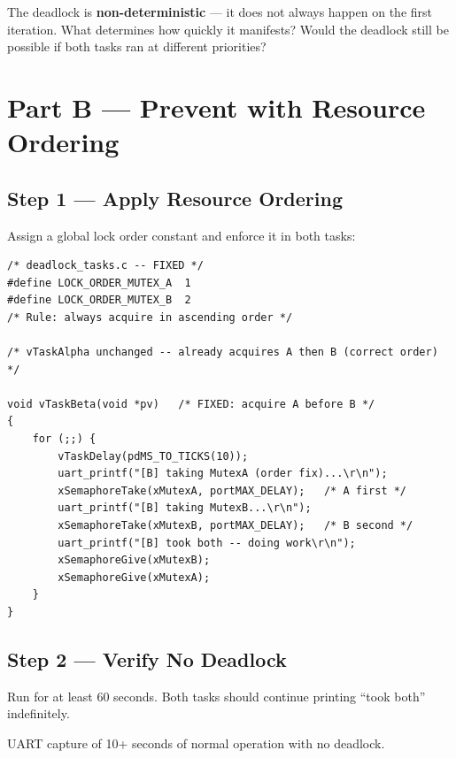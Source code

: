 \documentclass[11pt, a4paper]{article}
\begin{document}
\begin{questionbox}[~A2]
  The deadlock is \textbf{non-deterministic} --- it does not always happen on the first
  iteration. What determines how quickly it manifests? Would the deadlock still be
  possible if both tasks ran at different priorities?
\end{questionbox}

\section{Part B --- Prevent with Resource Ordering}

\subsection{Step 1 --- Apply Resource Ordering}

Assign a global lock order constant and enforce it in both tasks:

\begin{lstlisting}[style=cstyle]
/* deadlock_tasks.c -- FIXED */
#define LOCK_ORDER_MUTEX_A  1
#define LOCK_ORDER_MUTEX_B  2
/* Rule: always acquire in ascending order */

/* vTaskAlpha unchanged -- already acquires A then B (correct order) */

void vTaskBeta(void *pv)   /* FIXED: acquire A before B */
{
    for (;;) {
        vTaskDelay(pdMS_TO_TICKS(10));
        uart_printf("[B] taking MutexA (order fix)...\r\n");
        xSemaphoreTake(xMutexA, portMAX_DELAY);   /* A first */
        uart_printf("[B] taking MutexB...\r\n");
        xSemaphoreTake(xMutexB, portMAX_DELAY);   /* B second */
        uart_printf("[B] took both -- doing work\r\n");
        xSemaphoreGive(xMutexB);
        xSemaphoreGive(xMutexA);
    }
}
\end{lstlisting}

\subsection{Step 2 --- Verify No Deadlock}

Run for at least 60 seconds. Both tasks should continue printing ``took both''
indefinitely.

\begin{checkpointbox}[~B]
  UART capture of 10+ seconds of normal operation with no deadlock.
\end{checkpointbox}
\end{document}
